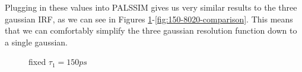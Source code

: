 Plugging in these values into PALSSIM gives us very similar results to the three gaussian IRF, as we can see in Figures \ref{fig:150-tau1-comparison}-\ref{fig:150-8020-comparison}. This means that we can comfortably simplify the three gaussian resolution function down to a single gaussian.

\begin{figure}[H]
    \caption{fixed $\tau_1 = 150ps$}
    \centering
    \label{fig:150-tau1-comparison}
\end{figure}

